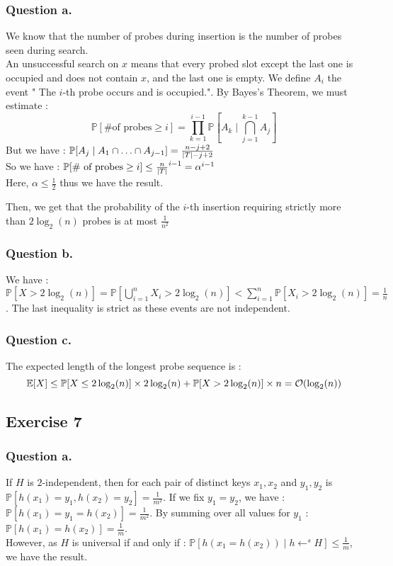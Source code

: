 \documentclass{cours}
\begin{document}
\subsubsection{Question a.}
We know that the number of probes during insertion is the number of probes seen during search.\\
An unsuccessful search on $x$ means that every probed slot except the last one is occupied and does not contain $x$, and the last one is empty. 
We define $A_{i}$ the event " The $i$-th probe occurs and is occupied.". By Bayes's Theorem, we must estimate : 
\[
    \mathbb{P}[\text{\# of probes} \geq i] = \prod_{k = 1}^{i - 1} \mathbb{P}[A_{k} \mid \bigcap\limits_{j = 1}^{k - 1} A_{j}]
\]
But we have : $\mathbb{P}[A_{j}\mid A_{1} \cap \ldots \cap A_{j - 1}] = \frac{n - j + 2}{\left|T\right| - j + 2}$\\
So we have : $\mathbb{P}[\text{\# of probes} \geq i] \leq \frac{n}{\left|T\right|}^{i - 1} = \alpha^{i - 1}$\\
Here, $\alpha \leq \frac{1}{2}$ thus we have the result. 

Then, we get that the probability of the $i$-th insertion requiring strictly more than $2\log_{2}(n)$ probes is at most $\frac{1}{n^{2}}$


\subsubsection{Question b.}
We have : $\mathbb{P}[X > 2\log_{2}(n)] = \mathbb{P}\left[\bigcup_{i=1}^{n}{X_{i} > 2 \log_{2}(n)}\right] < \sum_{i = 1}^{n}\mathbb{P}\left[X_{i} > 2\log_{2}(n)\right] = \frac{1}{n}$. 
The last inequality is strict as these events are not independent. 

\subsubsection{Question c.}
The expected length of the longest probe sequence is :
\[
        \mathbb{E}[X] \leq \mathbb{P}[X \leq 2\log_{2}(n)]\times 2\log_{2}(n) + \mathbb{P}[X > 2\log_{2}(n)]\times n = \mathcal{O}(\log_{2}(n))
\]

\subsection{Exercise 7}
\subsubsection{Question a.}
If $H$ is $2$-independent, then for each pair of distinct keys $x_{1}, x_{2}$ and $y_{1}, y_{2}$ is $\mathbb{P}[h(x_{1}) = y_{1}, h(x_{2}) = y_{2}] = \frac{1}{m^{2}}$. 
If we fix $y_{1} = y_{2}$, we have : $\mathbb{P}[h(x_{1}) =y_{1}= h(x_{2})] = \frac{1}{m^{2}}$. By summing over all values for $y_{1}$ :
$\mathbb{P}[h(x_{1}) = h(x_{2})] = \frac{1}{m}$.\\
However, as $H$ is universal if and only if : $\mathbb{P}[h(x_{1} = h(x_{2}))\mid h \gets^{s} H] \leq \frac{1}{m}$, we have the result. 
\end{document}
